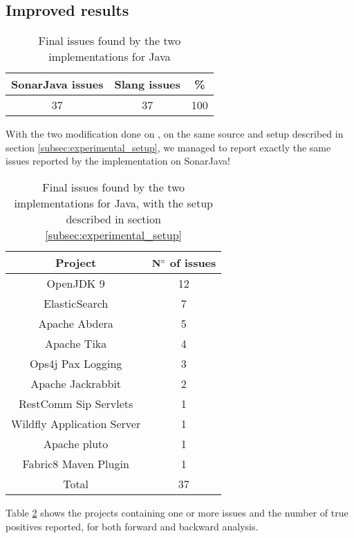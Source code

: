 \subsection{Improved results}
\label{subsec:improved_results}

\begin{table}[h]
	\centering
	\caption{Final issues found by the two implementations for Java}
	\label{table:final-sonarjava-vs-slang}
	\begin{tabular}{|c|c|c|}
		\hline
		\bf SonarJava issues & \bf Slang issues & \bf \% \\ \hline
		37 &  37 &  100 \\ \hline
	\end{tabular}
\end{table}

With the two modification done on \slang{}, on the same source and setup described in section \ref{subsec:experimental_setup}, we managed to report exactly the same issues reported by the implementation on SonarJava!

\begin{table}[h]
	\centering
	\caption{Final issues found by the two implementations for Java, with the setup described in section \ref{subsec:experimental_setup}}
	\label{table:issues-per-project}
	\begin{tabular}{|c|c|}
		\hline
		\bf Project & \bf $\bf N^{\circ}$  of issues\\ \hline
		OpenJDK 9 & 12 \\
		ElasticSearch & 7 \\
		Apache Abdera & 5 \\
		Apache Tika & 	4 \\
		Ops4j Pax Logging & 3 \\
		Apache Jackrabbit & 2 \\
		RestComm Sip Servlets & 1 \\
		Wildfly Application Server & 1 \\
		Apache pluto & 1 \\
		Fabric8 Maven Plugin & 1 \\\hline
		Total &  37 \\ \hline
	\end{tabular}
\end{table}


Table \ref{table:issues-per-project} shows the projects containing one or more issues and the number of true positives reported, for both forward and backward analysis. 

